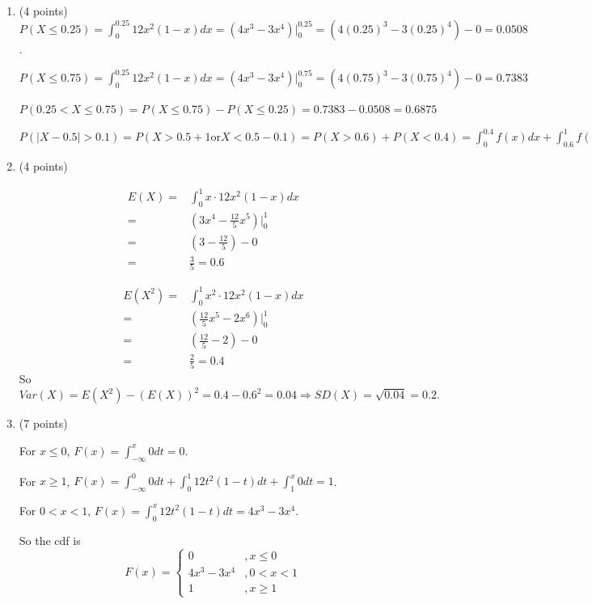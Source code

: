 \documentclass{article}\usepackage[]{graphicx}\usepackage[]{color}
\newenvironment{knitrout}{}{} %
\begin{document}
\begin{enumerate}
\begin{enumerate}
\begin{knitrout}
{}



\end{knitrout}
  
  \item (4 points)
  $P(X \leq 0.25) = \int_{0}^{0.25} 12x^2(1 - x) dx = (4x^3 - 3x^4)\big|_{0}^{0.25} = (4(0.25)^3 - 3(0.25)^4) - 0 = 0.0508$.
  
  $P(X \leq 0.75) = \int_{0}^{0.25} 12x^2(1 - x) dx = (4x^3 - 3x^4)\big|_{0}^{0.75} = (4(0.75)^3 - 3(0.75)^4) - 0 = 0.7383$
  
  $P(0.25 < X \leq 0.75) = P(X \leq 0.75) - P(X \leq 0.25) = 0.7383 - 0.0508 = 0.6875$
  
  $P(|X - 0.5| > 0.1) = P(X > 0.5 + 1 \textrm{or} X < 0.5 - 0.1) = P(X > 0.6) + P(X < 0.4) = \int_{0}^{0.4} f(x) dx + \int_{0.6}^1 f(x) dx = 0.7040$
  
  \item (4 points)
  
  \begin{align*}
  E(X) = & \int_{0}^1 x \cdot 12 x^2 (1 - x) dx \\
  =& (3x^4 - \frac{12}{5}x^5)\bigg|_{0}^1 \\
  = & (3 - \frac{12}{5}) - 0\\
  = & \frac{3}{5} = 0.6
  \end{align*}
  
  \begin{align*}
  E(X^2) = & \int_{0}^1 x^2 \cdot 12 x^2 (1 - x) dx \\
  =& (\frac{12}{5} x^5 - 2 x^6)\bigg|_{0}^1 \\
  = & (\frac{12}{5} -2) - 0\\
  = & \frac{2}{5} = 0.4
  \end{align*}
  So
  \[Var(X) = E(X^2) - (E(X))^2 = 0.4 - 0.6^2 = 0.04 \Rightarrow SD(X) = \sqrt{0.04} = 0.2. \]
  
  \item (7 points)
  
  For $x \leq 0$, $F(x) = \int_{-\infty}^x 0 dt = 0$.
  
  For $x \geq 1$, $F(x) = \int_{-\infty}^0 0dt + \int_{0}^1 12t^2(1 - t)dt + \int_{1}^{x} 0dt = 1$.
  
  For $0 < x < 1$, $F(x) = \int_{0}^x 12t^2 (1 - t)dt = 4x^3 - 3x^4.$
  
  So the cdf is
  \[F(x) = \begin{cases}
  0 & , x \leq 0\\
  4x^3 - 3x^4 & , 0 < x  <1\\
  1 &, x \geq 1
  \end{cases}\]
  

\end{enumerate}
\end{enumerate}
\end{document}
